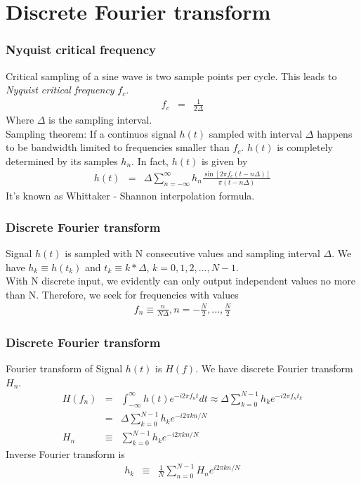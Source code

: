 \documentclass{beamer}
\begin{document}
\section{Discrete Fourier transform}
\begin{frame}
\frametitle{Nyquist critical frequency}
Critical sampling of a sine wave is two sample points per cycle. This leads to \emph{Nyquist critical frequency} $f_c$.
\begin{eqnarray}
f_c &=& \frac{1}{2\Delta}
\label{eq:Nyquist_frequency}
\end{eqnarray}
Where $\Delta$ is the sampling interval. \\
Sampling theorem: If a continuos signal $h(t)$ sampled with interval $\Delta$ happens to be bandwidth limited to frequencies smaller than $f_c$. $h(t)$ is completely determined by its samples $h_n$. In fact, $h(t)$ is given by 
\begin{eqnarray}
h(t) &=& \Delta \sum_{n=-\infty}^{\infty} h_n \frac{\sin [2\pi f_c(t-n\Delta)]}{\pi (t-n\Delta)}
\label{eq:sampling_theorem}
\end{eqnarray}
It's known as Whittaker - Shannon interpolation formula.
\end{frame}
\begin{frame}
\frametitle{Discrete Fourier transform}
Signal $h(t)$ is sampled with N consecutive values and sampling interval $\Delta$. We have $h_k \equiv h(t_k)$ and $t_k \equiv k*\Delta$, $k = 0,1,2,...,N-1$. \\
With N discrete input, we evidently can only output independent values no more than N. Therefore, we seek for frequencies with values
\begin{eqnarray}
f_n \equiv \frac{n}{N\Delta}, n = -\frac{N}{2}, ...,\frac{N}{2}
\label{eq:DFT_Frequencies}
\end{eqnarray}
\end{frame}
\begin{frame}
\frametitle{Discrete Fourier transform}
Fourier transform of Signal $h(t)$ is $H(f)$. We have discrete Fourier transform $H_n$.
\begin{eqnarray}
H(f_n)&=&\int_{-\infty}^{\infty}h(t)e^{-i2\pi f_nt}dt \approx \Delta \sum_{k=0}^{N-1}h_ke^{-i2\pi f_nt_k} \nonumber \\
&=& \Delta \sum_{k=0}^{N-1}h_ke^{-i2\pi kn/N} \nonumber \\
H_n &\equiv& \sum_{k=0}^{N-1}h_ke^{-i2\pi kn/N}
\label{eq:dft}
\end{eqnarray}
Inverse Fourier transform is
\begin{eqnarray}
h_k &\equiv& \frac{1}{N}\sum_{n=0}^{N-1}H_ne^{i2\pi kn/N}
\label{eq:idft}
\end{eqnarray}
\end{frame}
\end{document}
